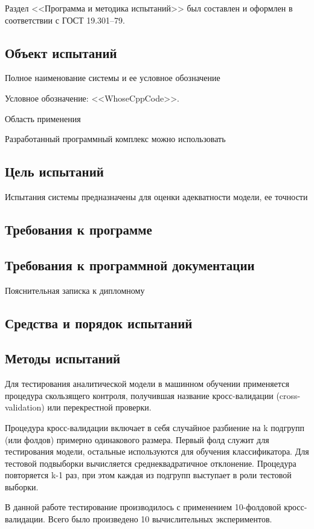 Раздел <<Программа и методика испытаний>> был составлен и оформлен в соответствии с ГОСТ 19.301--79.~\cite{gost_19301} 

\subsection{Объект испытаний}
Полное наименование системы и ее условное обозначение

Условное обозначение: <<WhoseCppCode>>.

Область применения

Разработанный программный комплекс можно использовать


\subsection{Цель испытаний}

Испытания системы предназначены для оценки адекватности модели, ее точности

\subsection{Требования к программе}

\subsection{Требования к программной документации}

Пояснительная записка к дипломному 

\subsection{Средства и порядок испытаний}

\subsection{Методы испытаний}

Для тестирования аналитической модели в машинном обучении применяется процедура скользящего
контроля, получившая название кросс-валидации (cross-validation) или перекрестной проверки.~\cite{crossval}

Процедура кросс-валидации включает в себя случайное разбиение на k подгрупп (или фолдов) примерно
одинакового размера. Первый фолд служит для тестирования модели, остальные используются для обучения
классификатора. Для тестовой подвыборки вычисляется среднеквадратичное отклонение. Процедура повторяется k-1
раз, при этом каждая из подгрупп выступает в роли тестовой выборки.

В данной работе тестирование производилось с применением 10-фолдовой кросс-валидации. Всего было произведено
10 вычислительных экспериментов.

